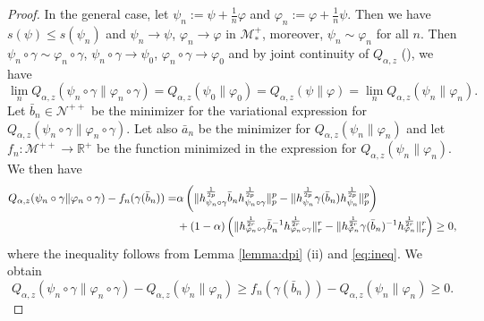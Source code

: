 \documentclass[12pt]{article}
\theoremstyle{definition}
\theoremstyle{remark}
\numberwithin{equation}{section}
\def\Me{\mathcal M}
\def\Ne{\mathcal N}
\def\ffi{\varphi}
\begin{document}
\begin{proof}
In the general case, let $\psi_n:=\psi+\frac1n \ffi$ and $\ffi_n:=\ffi+\frac1n \psi$. Then
we have $s(\psi)\le s(\psi_n)$ and  $\psi_n\to \psi$,  $\ffi_n\to \ffi$ in $\Me_*^+$,
moreover,  $\psi_n\sim \ffi_n$ for
all $n$. Then $\psi_n\circ\gamma\sim \ffi_n\circ\gamma$, $\psi_n\circ\gamma\to \psi_0$, $\ffi_n \circ \gamma\to \ffi_0$ and by joint
continuity of $Q_{\alpha,z}$ (\cite[Thm. 1 (iv)]{kato2023onrenyi}), we have
\[
\lim_n
Q_{\alpha,z}(\psi_n\circ\gamma\|\ffi_n\circ\gamma)=Q_{\alpha,z}(\psi_0\|\ffi_0)=Q_{\alpha,z}(\psi\|\ffi)=\lim_n
Q_{\alpha,z}(\psi_n\|\ffi_n).
\]
Let $\bar b_{n}\in \Ne^{++}$ be the minimizer for the variational expression for
$Q_{\alpha,z}(\psi_n\circ\gamma\|\ffi_n\circ\gamma)$. Let also $\bar a_n$ be the minimizer
for $Q_{\alpha,z}(\psi_n\|\ffi_n)$ and let $f_n:\Me^{++}\to \mathbb R^+$
be the function minimized in the expression for $Q_{\alpha,z}(\psi_n\|\ffi_n)$. 
We then have 
\begin{align*}
Q_{\alpha,z}(\psi_n\circ\gamma\|\ffi_n\circ\gamma)-f_n(\gamma(\bar
b_{n}))=&\alpha\left(\|h_{\psi_n\circ\gamma}^{\frac1{2p}}\bar b_{n}
h_{\psi_n\circ\gamma}^{\frac1{2p}}\|_p^p-\|h_{\psi_n}^{1\over 2p}\gamma(\bar
b_n)h_{\psi_n}^{1\over 2p}\|_p^p\right)\\
& + (1-\alpha)\left(\|h_{\ffi_n\circ\gamma}^{\frac1{2r}}\bar b_{n}^{-1}
h_{\ffi_n\circ\gamma}^{\frac1{2r}}\|_r^r-\|h_{\ffi_n}^{1\over 2r}\gamma(\bar
b_n)^{-1}h_{\ffi_n}^{1\over 2r}\|_r^r\right)\ge 0,
\end{align*}
where the inequality follows from Lemma \ref{lemma:dpi} (ii) and \eqref{eq:ineq}. We
obtain
\begin{equation}\label{eq:qfn}
Q_{\alpha,z}(\psi_n\circ\gamma\|\ffi_n\circ\gamma)-Q_{\alpha,z}(\psi_n\|\ffi_n)\ge f_n(\gamma(\bar
b_{n}))-Q_{\alpha,z}(\psi_n\|\ffi_n)\ge 0.
\end{equation}


\end{proof}
\end{document}
